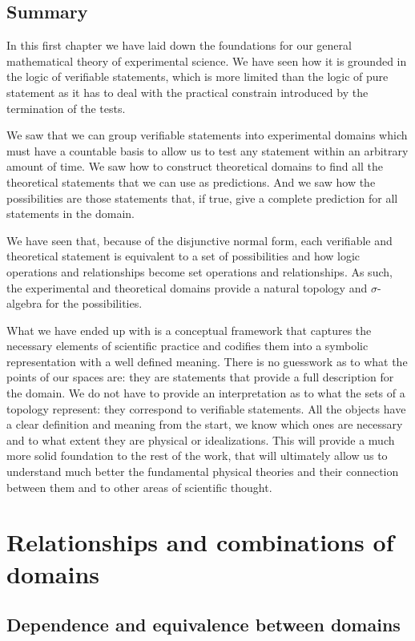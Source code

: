 \documentclass[11pt,letterpaper,fleqn]{memoir} %
\begin{document}
\section{Summary}

In this first chapter we have laid down the foundations for our general mathematical theory of experimental science. We have seen how it is grounded in the logic of verifiable statements, which is more limited than the logic of pure statement as it has to deal with the practical constrain introduced by the termination of the tests.

We saw that we can group verifiable statements into experimental domains which must have a countable basis to allow us to test any statement within an arbitrary amount of time. We saw how to construct theoretical domains to find all the theoretical statements that we can use as predictions. And we saw how the possibilities are those statements that, if true, give a complete prediction for all statements in the domain.

We have seen that, because of the disjunctive normal form, each verifiable and theoretical statement is equivalent to a set of possibilities and how logic operations and relationships become set operations and relationships. As such, the experimental and theoretical domains provide a natural topology and $\sigma$-algebra for the possibilities.

What we have ended up with is a conceptual framework that captures the necessary elements of scientific practice and codifies them into a symbolic representation with a well defined meaning. There is no guesswork as to what the points of our spaces are: they are statements that provide a full description for the domain. We do not have to provide an interpretation as to what the sets of a topology represent: they correspond to verifiable statements. All the objects have a clear definition and meaning from the start, we know which ones are necessary and to what extent they are physical or idealizations. This will provide a much more solid foundation to the rest of the work, that will ultimately allow us to understand much better the fundamental physical theories and their connection between them and to other areas of scientific thought.

\chapter{Relationships and combinations of domains}

\section{Dependence and equivalence between domains}
\end{document}
